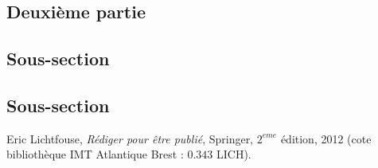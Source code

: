 \documentclass[11pt,a4paper,french]{article}
\begin{document}
\begin{IMTAannexes}
\section{Deuxième partie}

\subsection{Sous-section}
\subsection{Sous-section}

\end{IMTAannexes}

\newpage
{}

\begin{thebibliography}{99}
\bibitem{[Lichtfouse2012]} Eric Lichtfouse, \emph{Rédiger pour être publié}, Springer, $2^{eme}$ édition, 2012
 (cote bibliothèque IMT Atlantique Brest : $0.343$ LICH).
 
\end{thebibliography}
\IMTAcoverpage
\end{document}
